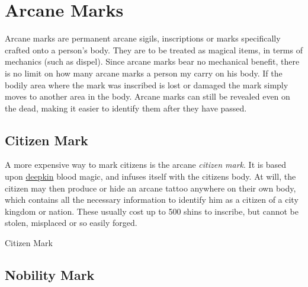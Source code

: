 \section{Arcane Marks}
\label{sec:Arcane Marks}

Arcane marks are permanent arcane sigils, inscriptions or marks specifically
crafted onto a person's body. They are to be treated as magical items, in terms
of mechanics (such as dispel). Since arcane marks bear no mechanical benefit,
there is no limit on how many arcane marks a person my carry on his body.
If the bodily area where the mark was inscribed is lost or damaged the mark
simply moves to another area in the body. Arcane marks can still be revealed
even on the dead, making it easier to identify them after they have passed.

\subsection{Citizen Mark}
\label{sec:Citizen Mark}

A more expensive way to mark citizens is the arcane \emph{citizen mark}. It is
based upon \hyperref[sec:Deepkin]{deepkin} blood magic, and infuses itself
with the citizens body. At will, the citizen may then produce or hide an
arcane tattoo anywhere on their own body, which contains all the necessary
information to identify him as a citizen of a city kingdom or nation. These
usually cost up to 500 shins to inscribe, but cannot be stolen, misplaced or
so easily forged.

\begin{35e}{Citizen Mark}
\end{35e}

\subsection{Nobility Mark}
\label{sec:Nobility Mark}

